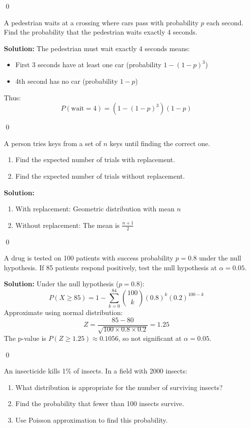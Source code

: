 \qed
\begin{problembox}
A pedestrian waits at a crossing where cars pass with probability \( p \) each second. Find the probability that the pedestrian waits exactly 4 seconds.
\end{problembox}

\noindent\textbf{Solution:}
The pedestrian must wait exactly 4 seconds means:
\begin{itemize}
\item First 3 seconds have at least one car (probability \( 1 - (1-p)^3 \))
\item 4th second has no car (probability \( 1-p \))
\end{itemize}
Thus:
\[ P(\text{wait}=4) = (1 - (1-p)^3)(1-p) \]


\qed
\begin{problembox}
A person tries keys from a set of \( n \) keys until finding the correct one.
\begin{enumerate}[label=(\alph*)]
\item Find the expected number of trials with replacement.
\item Find the expected number of trials without replacement.
\end{enumerate}
\end{problembox}

\noindent\textbf{Solution:}
\begin{enumerate}[label=(\alph*)]
\item With replacement: Geometric distribution with mean \( n \)
\item Without replacement: The mean is \( \frac{n+1}{2} \)
\end{enumerate}


\qed
\begin{problembox}
A drug is tested on 100 patients with success probability \( p = 0.8 \) under the null hypothesis. If 85 patients respond positively, test the null hypothesis at \( \alpha = 0.05 \).
\end{problembox}

\noindent\textbf{Solution:}
Under the null hypothesis (\( p = 0.8 \)):
\[ P(X \geq 85) = 1 - \sum_{k=0}^{84} \binom{100}{k} (0.8)^k (0.2)^{100-k} \]
Approximate using normal distribution:
\[ Z = \frac{85 - 80}{\sqrt{100 \times 0.8 \times 0.2}} = 1.25 \]
The p-value is \( P(Z \geq 1.25) \approx 0.1056 \), so not significant at \( \alpha = 0.05 \).


\qed
\begin{problembox}
An insecticide kills 1\% of insects. In a field with 2000 insects:
\begin{enumerate}[label=(\alph*)]
\item What distribution is appropriate for the number of surviving insects?
\item Find the probability that fewer than 100 insects survive.
\item Use Poisson approximation to find this probability.
\end{enumerate}
\end{problembox}

